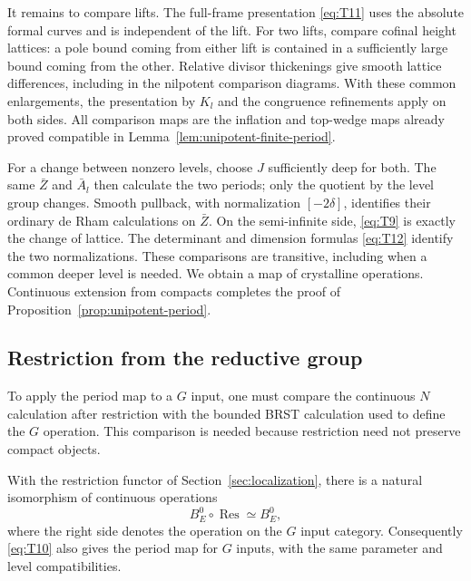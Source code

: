 It remains to compare lifts.  The full-frame presentation
\eqref{eq:T11} uses the absolute formal curves and is independent of
the lift.  For two lifts, compare cofinal height lattices: a pole
bound coming from either lift is contained in a sufficiently large
bound coming from the other.  Relative divisor thickenings give
smooth lattice differences, including in the nilpotent comparison
diagrams.  With these common enlargements, the presentation by
$K_l$ and the congruence refinements apply on both sides.  All
comparison maps are the inflation and top-wedge maps already proved
compatible in Lemma~\ref{lem:unipotent-finite-period}.

For a change between nonzero levels, choose $J$ sufficiently deep
for both.  The same $\bar Z$ and $\bar A_l$ then calculate the two
periods; only the quotient by the level group changes.  Smooth
pullback, with normalization $[-2\delta]$, identifies their ordinary
de Rham calculations on $\bar Z$.  On the semi-infinite side,
\eqref{eq:T9} is exactly the change of lattice.  The determinant and
dimension formulas \eqref{eq:T12} identify the two normalizations.
These comparisons are transitive, including when a common deeper
level is needed.  We obtain a map of crystalline operations.
Continuous extension from compacts completes the proof of
Proposition~\ref{prop:unipotent-period}.

\subsection{Restriction from the reductive group}

To apply the period map to a $G$ input, one must compare the
continuous $N$ calculation after restriction with the bounded BRST
calculation used to define the $G$ operation.  This comparison is
needed because restriction need not preserve compact objects.

\begin{lemma}\label{lem:unipotent-restriction}
With the restriction functor of Section~\ref{sec:localization}, there
is a natural isomorphism of continuous operations
\begin{equation}\label{eq:T15}
 B_E^0\circ\operatorname{Res}\simeq B_E^0,
\end{equation}
where the right side denotes the operation on the $G$ input category.
Consequently \eqref{eq:T10} also gives the period map for $G$ inputs,
with the same parameter and level compatibilities.
\end{lemma}

